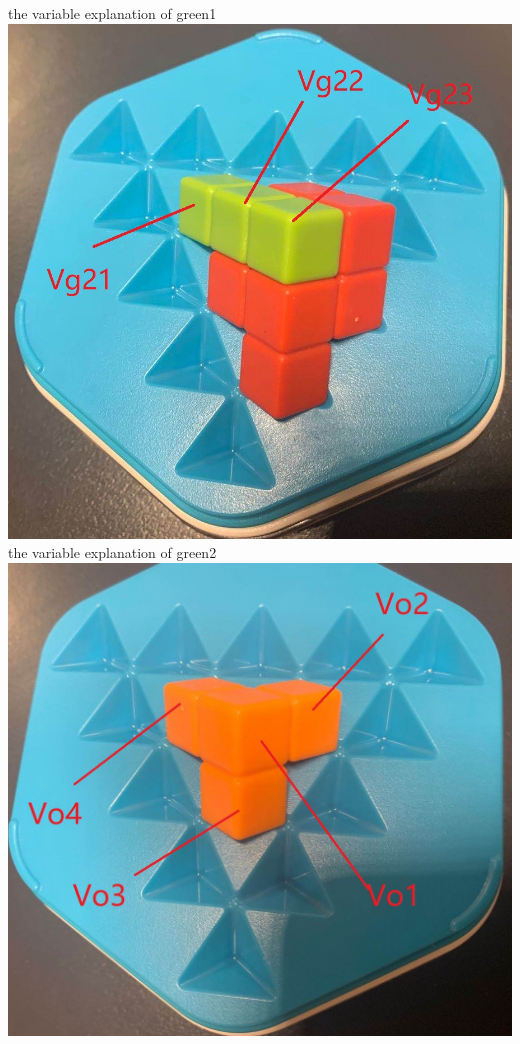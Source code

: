 \begin{center}
the variable explanation of green1\\
\includegraphics[scale=0.2]{figs/3Dgreen2.jpg}\\
the variable explanation of green2\\
\includegraphics[scale=0.2]{figs/3Dorange.jpg}\\

\end{center}
